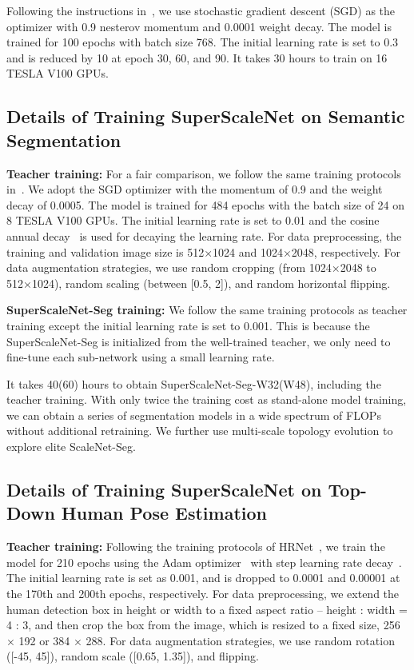 \documentclass[final]{cvpr}
\newcommand{\netname}{ScaleNet\xspace}
\newcommand{\supernet}{SuperScaleNet\xspace}
\begin{document}
Following the instructions in~\cite{wang2020deep}, we use stochastic gradient descent (SGD) as the optimizer with 0.9 nesterov momentum and 0.0001 weight decay. The model is trained for 100 epochs with batch size 768. The initial learning rate is set to 0.3 and is reduced by 10 at epoch 30, 60, and 90. It takes 30 hours to train on 16 TESLA V100 GPUs.

\subsection{Details of Training \supernet on Semantic Segmentation}
\label{semantic_seg_training_details}

\textbf{Teacher training:} For a fair comparison, we follow the same training protocols in~\cite{wang2020deep}. We adopt the SGD optimizer with the momentum of 0.9 and the weight decay of 0.0005. The model is trained for 484 epochs with the batch size of 24 on 8 TESLA V100 GPUs. The initial learning rate is set to 0.01 and the cosine annual decay~\cite{loshchilov2016sgdr} is used for decaying the learning rate. For data preprocessing, the training and validation image size is 512×1024 and 1024×2048, respectively. For data augmentation strategies, we use random cropping (from 1024×2048 to 512×1024), random scaling (between [0.5, 2]), and random horizontal flipping.

\textbf{SuperScaleNet-Seg training:} We follow the same training protocols as teacher training except the initial learning rate is set to 0.001. 
This is because the SuperScaleNet-Seg is initialized from the well-trained teacher, we only need to fine-tune each sub-network using a small learning rate.

It takes 40(60) hours to obtain \supernet-Seg-W32(W48), including the teacher training. With only twice the training cost as stand-alone model training, we can obtain a series of segmentation models in a wide spectrum of FLOPs without additional retraining. We further use multi-scale topology evolution to explore elite \netname-Seg. 

\subsection{Details of Training \supernet on Top-Down Human Pose Estimation}

\textbf{Teacher training:} Following the training protocols of HRNet~\cite{wang2020deep}, we train the model for 210 epochs using the Adam optimizer~\cite{kingma2014adam} with step learning rate decay~\cite{xiao2018simple, wang2020deep}. The initial learning rate is set as 0.001, and is dropped to 0.0001 and 0.00001 at the 170th and 200th epochs, respectively. For data preprocessing, we extend the human detection box in height or width to a fixed aspect ratio -- height : width = 4 : 3, and then crop the box from the image, which is resized to a fixed size, 256 × 192 or 384 × 288. For data augmentation strategies, we use random rotation ([-45, 45]), random scale ([0.65, 1.35]), and flipping.
\end{document}
